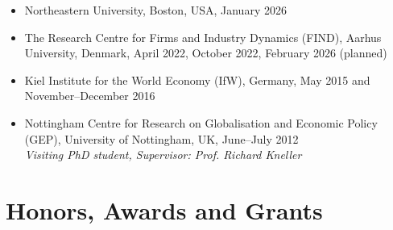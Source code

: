 \documentclass[11pt,a4paper]{article}
\newcommand{\cventry}[1]{\item #1}
\begin{document}
\begin{itemize}
  \cventry{Northeastern University, Boston, USA, January 2026}
  \cventry{The Research Centre for Firms and Industry Dynamics (FIND), Aarhus University, Denmark, April 2022, October 2022, February 2026 (planned)}
  \cventry{Kiel Institute for the World Economy (IfW), Germany, May 2015 and November--December 2016}
  \cventry{Nottingham Centre for Research on Globalisation and Economic Policy (GEP), University of Nottingham, UK, June--July 2012\\
  \textit{Visiting PhD student, Supervisor: Prof. Richard Kneller}}
\end{itemize}

\section{Honors, Awards and Grants}
\end{document}
